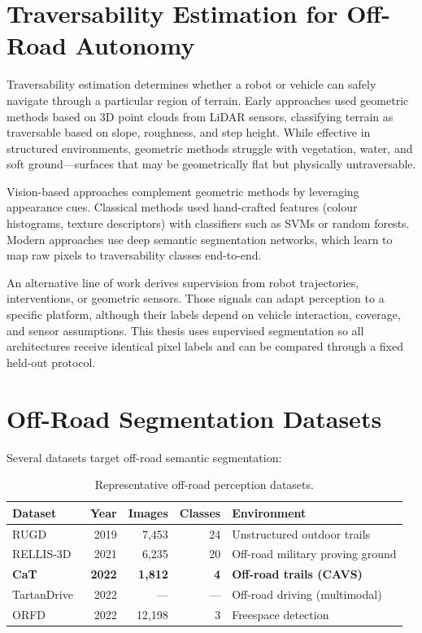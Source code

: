 \documentclass[12pt,a4paper]{report}
\begin{document}
\section{Traversability Estimation for Off-Road Autonomy}

Traversability estimation determines whether a robot or vehicle can safely navigate through a particular region of terrain.
Early approaches used geometric methods based on 3D point clouds from LiDAR sensors, classifying terrain as traversable based on slope, roughness, and step height.
While effective in structured environments, geometric methods struggle with vegetation, water, and soft ground---surfaces that may be geometrically flat but physically untraversable.

Vision-based approaches complement geometric methods by leveraging appearance cues.
Classical methods used hand-crafted features (colour histograms, texture descriptors) with classifiers such as SVMs or random forests.
Modern approaches use deep semantic segmentation networks, which learn to map raw pixels to traversability classes end-to-end.

An alternative line of work derives supervision from robot trajectories,
interventions, or geometric sensors. Those signals can adapt perception to a
specific platform, although their labels depend on vehicle interaction,
coverage, and sensor assumptions. This thesis uses supervised segmentation so
all architectures receive identical pixel labels and can be compared through a
fixed held-out protocol.

\section{Off-Road Segmentation Datasets}

Several datasets target off-road semantic segmentation:

\begin{table}[H]
\centering
\caption{Representative off-road perception datasets.}
\label{tab:offroad_datasets}
\small
\begin{tabular}{@{}lrrrl@{}}
\toprule
\textbf{Dataset} & \textbf{Year} & \textbf{Images} & \textbf{Classes} & \textbf{Environment} \\
\midrule
RUGD~\cite{wigness2019rugd}          & 2019 & 7{,}453  & 24 & Unstructured outdoor trails \\
RELLIS-3D~\cite{jiang2021rellis}     & 2021 & 6{,}235 & 20 & Off-road military proving ground \\
\textbf{CaT}  & \textbf{2022} & \textbf{1{,}812} & \textbf{4} & \textbf{Off-road trails (CAVS)} \\
TartanDrive~\cite{triest2022tartandrive} & 2022 & --- & --- & Off-road driving (multimodal) \\
ORFD~\cite{min2022orfd}          & 2022 & 12{,}198 & 3  & Freespace detection \\
\bottomrule
\end{tabular}
\end{table}
\end{document}
